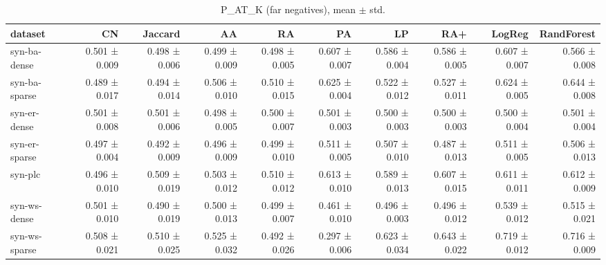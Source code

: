 \begin{table}[t]
\centering
\caption{P_AT_K (far negatives), mean $\pm$ std.}
\label{tab:main_p_at_k_far}
\begin{tabular}{lrrrrrrrrr}
\hline
dataset & CN & Jaccard & AA & RA & PA & LP & RA+ & LogReg & RandForest \\
\hline
syn-ba-dense & 0.501 ± 0.009 & 0.498 ± 0.006 & 0.499 ± 0.009 & 0.498 ± 0.005 & 0.607 ± 0.007 & 0.586 ± 0.004 & 0.586 ± 0.005 & 0.607 ± 0.007 & 0.566 ± 0.008 \\
syn-ba-sparse & 0.489 ± 0.017 & 0.494 ± 0.014 & 0.506 ± 0.010 & 0.510 ± 0.015 & 0.625 ± 0.004 & 0.522 ± 0.012 & 0.527 ± 0.011 & 0.624 ± 0.005 & 0.644 ± 0.008 \\
syn-er-dense & 0.501 ± 0.008 & 0.501 ± 0.006 & 0.498 ± 0.005 & 0.500 ± 0.007 & 0.501 ± 0.003 & 0.500 ± 0.003 & 0.500 ± 0.003 & 0.500 ± 0.004 & 0.501 ± 0.004 \\
syn-er-sparse & 0.497 ± 0.004 & 0.492 ± 0.009 & 0.496 ± 0.009 & 0.499 ± 0.010 & 0.511 ± 0.005 & 0.507 ± 0.010 & 0.487 ± 0.013 & 0.511 ± 0.005 & 0.506 ± 0.013 \\
syn-plc & 0.496 ± 0.010 & 0.509 ± 0.019 & 0.503 ± 0.012 & 0.510 ± 0.012 & 0.613 ± 0.010 & 0.589 ± 0.013 & 0.607 ± 0.015 & 0.611 ± 0.011 & 0.612 ± 0.009 \\
syn-ws-dense & 0.501 ± 0.010 & 0.490 ± 0.019 & 0.500 ± 0.013 & 0.499 ± 0.007 & 0.461 ± 0.010 & 0.496 ± 0.003 & 0.496 ± 0.012 & 0.539 ± 0.012 & 0.515 ± 0.021 \\
syn-ws-sparse & 0.508 ± 0.021 & 0.510 ± 0.025 & 0.525 ± 0.032 & 0.492 ± 0.026 & 0.297 ± 0.006 & 0.623 ± 0.034 & 0.643 ± 0.022 & 0.719 ± 0.012 & 0.716 ± 0.009 \\
\hline
\end{tabular}
\end{table}